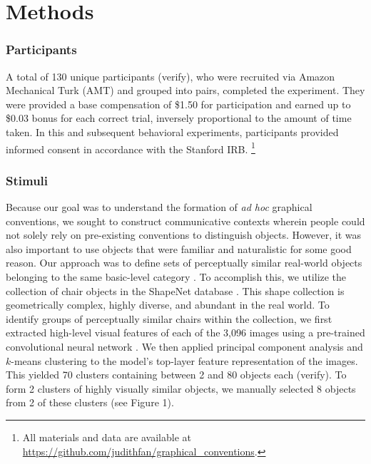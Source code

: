 \documentclass[10pt,letterpaper]{article}
\begin{document}




\section{Methods}

\subsubsection{Participants}
A total of 130 unique participants (verify), who were recruited via Amazon Mechanical Turk (AMT) and grouped into pairs, completed the experiment. They were provided a base compensation of \$1.50 for participation and earned up to \$0.03 bonus for each correct trial, inversely proportional to the amount of time taken. In this and subsequent behavioral experiments, participants provided informed consent in accordance with the Stanford IRB.
\footnote{All materials and data are available at \url{https://github.com/judithfan/graphical_conventions}.}

\subsubsection{Stimuli}
Because our goal was to understand the formation of \textit{ad hoc} graphical conventions, we sought to construct communicative contexts wherein people could not solely rely on pre-existing conventions to distinguish objects. 
However, it was also important to use objects that were familiar and naturalistic for some good reason.
Our approach was to define sets of perceptually similar real-world objects belonging to the same basic-level category \cite{MervisRosch81_CategorizationReview}.
To accomplish this, we utilize the collection of chair objects in the ShapeNet database \cite{chang2015shapenet}. 
This shape collection is  geometrically complex, highly diverse, and abundant in the real world. 
To identify groups of perceptually similar chairs within the collection, we first extracted high-level visual features of each of the 3,096 images using a pre-trained convolutional neural network \cite{simonyan2014very}. 
We then applied principal component analysis and $k$-means clustering to the model's top-layer feature representation of the images. 
This yielded 70 clusters containing between 2 and 80 objects each (verify). To form 2 clusters of highly visually similar objects, we manually selected 8 objects from 2 of these clusters (see Figure 1). 
\end{document}
